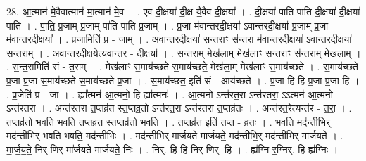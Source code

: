 \documentclass[17pt]{extarticle}
\begin{document}
28. आ॒त्मान॑ मे॒वैवात्मान॑ मा॒त्मान॑ मे॒व । . ए॒व दी॒क्षया॑ दी॒क्ष यै॒वैव दी॒क्षया᳚ । . दी॒क्षया॑ पाति पाति दी॒क्षया॑ दी॒क्षया॑ पाति । . पा॒ति॒ प्र॒जाम् प्र॒जाम् पा॑ति पाति प्र॒जाम् । . प्र॒जा म॑वान्तरदी॒क्षया॑ ऽवान्तरदी॒क्षया᳚ प्र॒जाम् प्र॒जा म॑वान्तरदी॒क्षया᳚ । . प्र॒जामिति॑ प्र - जाम् । . अ॒वा॒न्त॒र॒दी॒क्षया॑ सन्त॒राꣳ स॑न्त॒रा म॑वान्तरदी॒क्षया॑ ऽवान्तरदी॒क्षया॑ सन्त॒राम् । . अ॒वा॒न्त॒र॒दी॒क्षयेत्य॑वान्तर - दी॒क्षया᳚ । . स॒न्त॒राम् मेख॑ला॒म् मेख॑लाꣳ सन्त॒राꣳ स॑न्त॒राम् मेख॑लाम् । . स॒न्त॒रामिति॑ सं - त॒राम् । . मेख॑लाꣳ स॒माय॑च्छते स॒माय॑च्छते॒ मेख॑ला॒म् मेख॑लाꣳ स॒माय॑च्छते । . स॒माय॑च्छते प्र॒जा प्र॒जा स॒माय॑च्छते स॒माय॑च्छते प्र॒जा । . स॒माय॑च्छत॒ इति॑ सं - आय॑च्छते । . प्र॒जा हि हि प्र॒जा प्र॒जा हि । . प्र॒जेति॑ प्र - जा । . ह्या᳚त्मन॑ आ॒त्मनो॒ हि ह्या᳚त्मनः॑ । . आ॒त्मनो ऽन्त॑रत॒रा ऽन्त॑रतरा॒ ऽऽत्मन॑ आ॒त्मनो ऽन्त॑रतरा । . अन्त॑रतरा त॒प्तव्र॑त स्त॒प्तव्र॒तो ऽन्त॑रत॒रा ऽन्त॑रतरा त॒प्तव्र॑तः । . अन्त॑रत॒रेत्यन्त॑र - त॒रा॒ । . त॒प्तव्र॑तो भवति भवति त॒प्तव्र॑त स्त॒प्तव्र॑तो भवति । . त॒प्तव्र॑त॒ इति॑ त॒प्त - व्र॒तः॒ । . भ॒व॒ति॒ मद॑न्तीभि॒र् मद॑न्तीभिर् भवति भवति॒ मद॑न्तीभिः । . मद॑न्तीभिर् मार्जयते मार्जयते॒ मद॑न्तीभि॒र् मद॑न्तीभिर् मार्जयते । . मा॒र्ज॒य॒ते॒ निर् णिर् मा᳚र्जयते मार्जयते॒ निः । . निर्. हि हि निर् णिर्. हि । . ह्य॑ग्नि र॒ग्निर्. हि ह्य॑ग्निः । \newline
\end{document}
